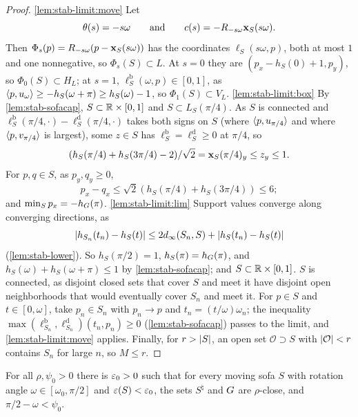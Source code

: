 \begin{proof}
\ref{lem:stab-limit:move} Let
\[
  \theta(s)=-s\omega\qquad\text{and}\qquad c(s)=-R_{-s\omega}\mathbf{x}_S(s\omega).
\]
Then $\Phi_s(p)=R_{-s\omega}(p-\mathbf{x}_S(s\omega))$ has the coordinates
$\ell_S(s\omega,p)$, both at most $1$ and one nonnegative, so
$\Phi_s(S)\subset L$. At $s=0$ they are $(p_x-h_S(0)+1,p_y)$, so
$\Phi_0(S)\subset H_L$; at $s=1$, $\ell^{\mathrm b}_S(\omega,p)\in[0,1]$, as
$\langle p,u_\omega\rangle\ge-h_S(\omega+\pi)\ge h_S(\omega)-1$, so
$\Phi_1(S)\subset V_L$.
\ref{lem:stab-limit:box} By \cref{lem:stab-sofacap}, $S\subset\mathbb{R}\times[0,1]$
and $S\subset L_S(\pi/4)$. As $S$ is connected and
$\ell^{\mathrm b}_S(\pi/4,\cdot)-\ell^{\mathrm d}_S(\pi/4,\cdot)$ takes both
signs on $S$ (where $\langle p,u_{\pi/4}\rangle$ and where $\langle p,v_{\pi/4}\rangle$ is
largest), some $z\in S$ has $\ell^{\mathrm b}_S=\ell^{\mathrm d}_S\ge0$ at
$\pi/4$, so
\[
  (h_S(\pi/4)+h_S(3\pi/4)-2)/\sqrt2=\mathbf{x}_S(\pi/4)_y\le z_y\le1.
\]
For $p,q\in S$, as $p_y,q_y\ge0$,
\[
  p_x-q_x\le\sqrt2(h_S(\pi/4)+h_S(3\pi/4))\le6;
\]
and $\min_Sp_x=-h_G(\pi)$. \ref{lem:stab-limit:lim} Support values converge
along converging directions, as
\[
  \lvert h_{S_n}(t_n)-h_S(t)\rvert\le2d_\infty(S_n,S)+\lvert h_S(t_n)-h_S(t)\rvert
\]
(\cref{lem:stab-lower}). So $h_S(\pi/2)=1$, $h_S(\pi)=h_G(\pi)$, and
$h_S(\omega)+h_S(\omega+\pi)\le1$ by \cref{lem:stab-sofacap}; and
$S\subset\mathbb{R}\times[0,1]$. $S$ is connected, as disjoint closed sets that cover
$S$ and meet it have disjoint open neighborhoods that would eventually cover
$S_n$ and meet it. For $p\in S$ and $t\in[0,\omega]$, take $p_n\in S_n$ with
$p_n\to p$ and $t_n=(t/\omega)\omega_n$; the inequality
$\max(\ell^{\mathrm b}_{S_n},\ell^{\mathrm d}_{S_n})(t_n,p_n)\ge0$
(\cref{lem:stab-sofacap}) passes to the limit, and \ref{lem:stab-limit:move}
applies. Finally, for $r>\lvert S\rvert$, an open set $\mathcal O\supset S$ with
$\lvert \mathcal O\rvert<r$ contains $S_n$ for large $n$, so $M\le r$.
\end{proof}

\begin{proposition}\label{prop:stab-entry}
For all $\rho,\psi_0>0$ there is $\varepsilon_0>0$ such that for every moving sofa
$S$ with rotation angle $\omega\in[\omega_0,\pi/2]$ and $\varepsilon(S)<\varepsilon_0$, the
sets $S^\natural$ and $G$ are $\rho$-close, and $\pi/2-\omega<\psi_0$.
\end{proposition}

